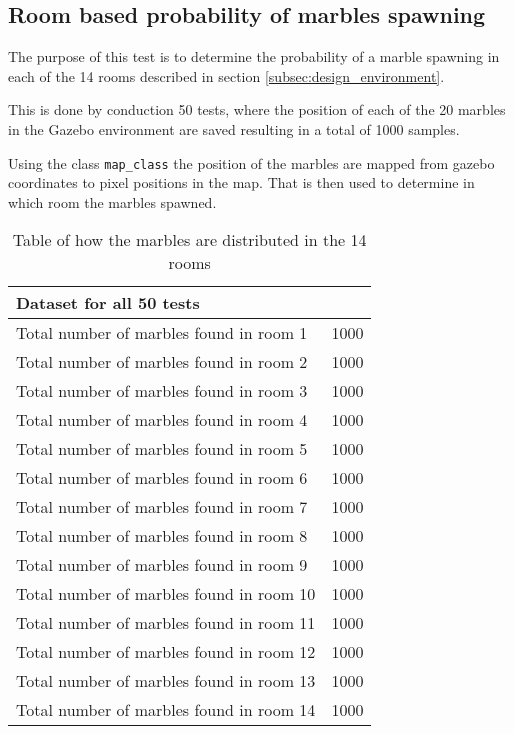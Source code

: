 \documentclass[../Head/Main.tex]{subfiles}
\begin{document}
\subsection{Room based probability of marbles spawning}
The purpose of this test is to determine the probability of a marble spawning in each of the 14 rooms described in section \ref{subsec:design_environment}.\par 
This is done by conduction 50 tests, where the position of each of the 20 marbles in the Gazebo environment are saved resulting in a total of 1000 samples.\par 
Using the class \texttt{map\_class} the position of the marbles are mapped from gazebo coordinates to pixel positions in the map. That is then used to determine in which room the marbles spawned.

\begin{table}[H]
	\centering
	\begin{tabular}{l c}
		\hline
		\multicolumn{2}{l}{\textbf{Dataset for all 50 tests}}  			\\ \hline
		Total number of marbles found in room 1  & 1000\\
		Total number of marbles found in room 2  & 1000\\
		Total number of marbles found in room 3  & 1000\\
		Total number of marbles found in room 4  & 1000\\
		Total number of marbles found in room 5  & 1000\\
		Total number of marbles found in room 6  & 1000\\
		Total number of marbles found in room 7  & 1000\\
		Total number of marbles found in room 8  & 1000\\
		Total number of marbles found in room 9  & 1000\\
		Total number of marbles found in room 10 & 1000\\
		Total number of marbles found in room 11 & 1000\\
		Total number of marbles found in room 12 & 1000\\
		Total number of marbles found in room 13 & 1000\\
		Total number of marbles found in room 14 & 1000\\			\hline
	\end{tabular}
	\caption{Table of how the marbles are distributed in the 14 rooms}
	\label{tab:probability_raw_data}
\end{table}   
\end{document}

